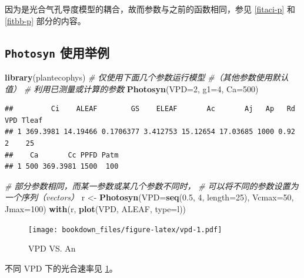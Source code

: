 \documentclass[
]{krantz}
\makeatletter
\newenvironment{Shaded}{\begin{snugshade}}{\end{snugshade}}
\newcommand{\CommentTok}[1]{\textcolor[rgb]{0.56,0.35,0.01}{\textit{#1}}}
\newcommand{\DataTypeTok}[1]{\textcolor[rgb]{0.13,0.29,0.53}{#1}}
\newcommand{\DecValTok}[1]{\textcolor[rgb]{0.00,0.00,0.81}{#1}}
\newcommand{\FloatTok}[1]{\textcolor[rgb]{0.00,0.00,0.81}{#1}}
\newcommand{\KeywordTok}[1]{\textcolor[rgb]{0.13,0.29,0.53}{\textbf{#1}}}
\newcommand{\NormalTok}[1]{#1}
\newcommand{\StringTok}[1]{\textcolor[rgb]{0.31,0.60,0.02}{#1}}
\newenvironment{kframe}{%
\medskip{}
\setlength{\fboxsep}{.8em}
 \def\at@end@of@kframe{}%
 \ifinner\ifhmode%
  \def\at@end@of@kframe{\end{minipage}}%
  \begin{minipage}{\columnwidth}%
 \fi\fi%
 \def\FrameCommand##1{\hskip\@totalleftmargin \hskip-\fboxsep
 \colorbox{shadecolor}{##1}\hskip-\fboxsep
     \hskip-\linewidth \hskip-\@totalleftmargin \hskip\columnwidth}%
 \MakeFramed {\advance\hsize-\width
   \@totalleftmargin\z@ \linewidth\hsize
   \@setminipage}}%
 {\par\unskip\endMakeFramed%
 \at@end@of@kframe}
\renewenvironment{Shaded}{\begin{kframe}}{\end{kframe}}
\makeatother
\begin{document}
因为是光合气孔导度模型的耦合，故而参数与之前的函数相同，参见 \ref{fitaci-p} 和 \ref{fitbb-p} 部分的内容。

\hypertarget{photo_exam}{%
\subsection{\texorpdfstring{\texttt{Photosyn} 使用举例}{Photosyn 使用举例}}\label{photo_exam}}

\begin{Shaded}
\begin{Highlighting}[]
\KeywordTok{library}\NormalTok{(plantecophys)}
\CommentTok{\# 仅使用下面几个参数运行模型}
\CommentTok{\#（其他参数使用默认值）}
\CommentTok{\# 利用已测量或计算的参数}
\KeywordTok{Photosyn}\NormalTok{(}\DataTypeTok{VPD=}\DecValTok{2}\NormalTok{, }\DataTypeTok{g1=}\DecValTok{4}\NormalTok{, }\DataTypeTok{Ca=}\DecValTok{500}\NormalTok{)}
\end{Highlighting}
\end{Shaded}

\begin{verbatim}
##         Ci    ALEAF        GS    ELEAF       Ac       Aj   Ap   Rd VPD Tleaf
## 1 369.3981 14.19466 0.1706377 3.412753 15.12654 17.03685 1000 0.92   2    25
##    Ca       Cc PPFD Patm
## 1 500 369.3981 1500  100
\end{verbatim}

\begin{Shaded}
\begin{Highlighting}[]
\CommentTok{\# 部分参数相同，而某一参数或某几个参数不同时，}
\CommentTok{\# 可以将不同的参数设置为一个序列（vectors）}
\NormalTok{r \textless{}{-}}\StringTok{ }\KeywordTok{Photosyn}\NormalTok{(}\DataTypeTok{VPD=}\KeywordTok{seq}\NormalTok{(}\FloatTok{0.5}\NormalTok{, }\DecValTok{4}\NormalTok{, }\DataTypeTok{length=}\DecValTok{25}\NormalTok{), }
              \DataTypeTok{Vcmax=}\DecValTok{50}\NormalTok{, }\DataTypeTok{Jmax=}\DecValTok{100}\NormalTok{)}
\KeywordTok{with}\NormalTok{(r, }\KeywordTok{plot}\NormalTok{(VPD, ALEAF, }\DataTypeTok{type=}\StringTok{\textquotesingle{}l\textquotesingle{}}\NormalTok{))}
\end{Highlighting}
\end{Shaded}

\begin{figure}
\centering
\texttt{[image: bookdown\_files/figure-latex/vpd-1.pdf]}
\caption{\label{fig:vpd}VPD VS. An}
\end{figure}

不同 VPD 下的光合速率见 \ref{fig:vpd}。
\end{document}
